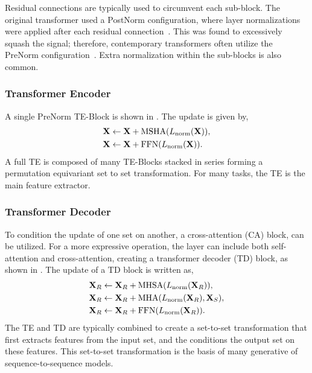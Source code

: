 Residual connections are typically used to circumvent each sub-block.
The original transformer used a PostNorm configuration, where layer normalizations were applied after each residual connection~\cite{Attention}.
This was found to excessively squash the signal; therefore, contemporary transformers often utilize the PreNorm configuration~\cite{PreLN}.
Extra normalization within the sub-blocks is also common.

\subsubsection{Transformer Encoder}

A single PreNorm TE-Block is shown in .
The update is given by,
\begin{equation}
\begin{aligned}
    \mathbf{X} & \leftarrow \mathbf{X} + \text{MSHA}(L_\text{norm}(\mathbf{X})), \\
    \mathbf{X} & \leftarrow \mathbf{X} + \text{FFN}(L_\text{norm}(\mathbf{X})).
\end{aligned}
\end{equation}
A full TE is composed of many TE-Blocks stacked in series forming a permutation equivariant set to set transformation.
For many tasks, the TE is the main feature extractor.

\subsubsection{Transformer Decoder}

To condition the update of one set on another, a cross-attention (CA) block, can be utilized.
For a more expressive operation, the layer can include both self-attention and cross-attention, creating a transformer decoder (TD) block, as shown in .
The update of a TD block is written as,
\begin{equation}
\begin{aligned}
    \mathbf{X}_R & \leftarrow \mathbf{X}_R + \text{MHSA}(L_\text{norm}(\mathbf{X}_R)), \\
    \mathbf{X}_R & \leftarrow \mathbf{X}_R + \text{MHA}(L_\text{norm}(\mathbf{X}_R), \mathbf{X}_S), \\
    \mathbf{X}_R & \leftarrow \mathbf{X}_R + \text{FFN}(L_\text{norm}(\mathbf{X}_R)).
\end{aligned}
\end{equation}
The TE and TD are typically combined to create a set-to-set transformation that first extracts features from the input set, and the conditions the output set on these features.
This set-to-set transformation is the basis of many generative of sequence-to-sequence models.

